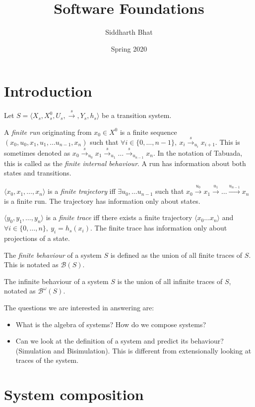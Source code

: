 \documentclass[11pt]{book}
\title{Software Foundations}
\author{Siddharth Bhat}
\date{Spring 2020}
\newcommand{\B}{\ensuremath{\mathcal{B}}}
\newcommand{\Bomega}{\ensuremath{\mathcal{B}^\omega}}
\begin{document}
\maketitle
\tableofcontents

\chapter{Introduction}

Let $S = \langle X_s, X_s^0, U_s, \xrightarrow{s}, Y_s, h_s \rangle$ be
a transition system.

A \emph{finite run} originating from $x_0 \in X^0$  is a finite sequence
$(x_0, u_0, x_1, u_1, \dots u_{n-1}, x_n)$ such that $\forall i \in \{0, \dots, n-1\},~ x_i \xrightarrow{s}_{u_i} x_{i+1}$.
This is sometimes denoted as $x_0 \xrightarrow{s}_{u_0} x_1 \xrightarrow{s}_{u_1} \dots \xrightarrow{s}_{u_{n-1}} x_n$.
In the notation of Tabuada, this is called as the \emph{finite internal behaviour}.
A run has information about both states and transitions.

$\langle x_0, x_1, \dots, x_n \rangle$ is a \emph{finite trajectory} iff
$\exists u_0, \dots u_{n-1}$ such that $x_0 \xrightarrow{u_0} x_1 \xrightarrow{u_1} \dots \xrightarrow{u_{n-1}} x_n$
is a finite run. The trajectory has information only about states.

$\langle y_0, y_1, \dots, y_n \rangle$ is a \emph{finite trace} iff
there exists a finite trajectory $\langle x_0 \dots x_n \rangle$ and
$\forall i \in \{0, \dots, n \}, ~y_i = h_s(x_i)$. The finite trace has 
information only about projections of a state.

The \emph{finite behaviour} of a system $S$ is defined as the union of all
finite traces of $S$. This is notated as $\B(S)$.

The infinite behaviour of a system $S$ is the union of all infinite traces
of $S$, notated as $\Bomega(S)$.

The questions we are interested in answering are:
\begin{itemize}
    \item What is the algebra of systems? How do we compose systems?
    \item Can we look at the definition of a system and predict its behaviour?
        (Simulation and Bisimulation). This is different from extensionally
        looking at traces of the system.
\end{itemize}

\chapter{System composition}
\end{document}
